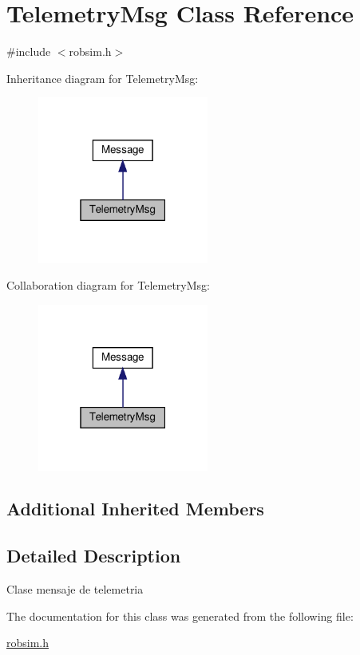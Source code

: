 \hypertarget{class_telemetry_msg}{}\section{Telemetry\+Msg Class Reference}
\label{class_telemetry_msg}


{\ttfamily \#include $<$robsim.\+h$>$}



Inheritance diagram for Telemetry\+Msg\+:
\nopagebreak
\begin{figure}[H]
\begin{center}
\leavevmode
\includegraphics[width=159pt]{class_telemetry_msg__inherit__graph}
\end{center}
\end{figure}


Collaboration diagram for Telemetry\+Msg\+:
\nopagebreak
\begin{figure}[H]
\begin{center}
\leavevmode
\includegraphics[width=159pt]{class_telemetry_msg__coll__graph}
\end{center}
\end{figure}
\subsection*{Additional Inherited Members}


\subsection{Detailed Description}
Clase mensaje de telemetria 

The documentation for this class was generated from the following file\+:\begin{DoxyCompactItemize}
\item 
\hyperlink{robsim_8h}{robsim.\+h}\end{DoxyCompactItemize}
